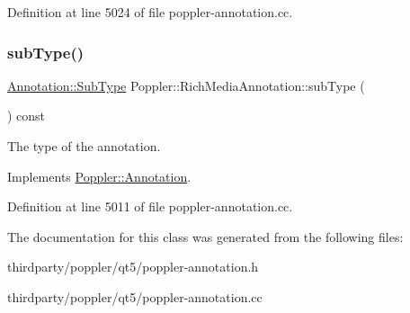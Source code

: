 Definition at line 5024 of file poppler-\/annotation.\+cc.

\mbox{\label{class_poppler_1_1_rich_media_annotation_ae853275d25fdd1e415ce28045dbc857f}} 
\subsubsection{\texorpdfstring{sub\+Type()}{subType()}}
{\footnotesize\ttfamily \hyperlink{class_poppler_1_1_annotation_a2d592999c330949d64679cfa9e81113f}{Annotation\+::\+Sub\+Type} Poppler\+::\+Rich\+Media\+Annotation\+::sub\+Type (\begin{DoxyParamCaption}{ }\end{DoxyParamCaption}) const\hspace{0.3cm}{\ttfamily [virtual]}}

The type of the annotation. 

Implements \hyperlink{class_poppler_1_1_annotation_aef7fa1532193b41fbeba6e577579d984}{Poppler\+::\+Annotation}.



Definition at line 5011 of file poppler-\/annotation.\+cc.



The documentation for this class was generated from the following files\+:\begin{DoxyCompactItemize}
\item 
thirdparty/poppler/qt5/poppler-\/annotation.\+h\item 
thirdparty/poppler/qt5/poppler-\/annotation.\+cc\end{DoxyCompactItemize}
